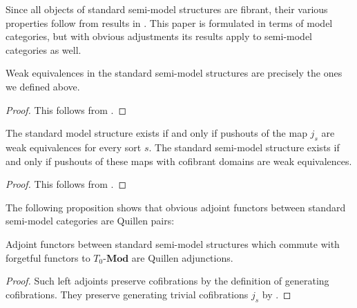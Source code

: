 \documentclass[reqno]{amsart}
\theoremstyle{definition}
\theoremstyle{remark}
\newcommand{\bcat}[1]{\mathbf{#1}}
\newcommand{\Mod}[1]{#1\text{-}\bcat{Mod}}
\numberwithin{figure}{section}
\begin{document}
Since all objects of standard semi-model structures are fibrant, their various properties follow from results in \cite{f-model-structures}.
This paper is formulated in terms of model categories, but with obvious adjustments its results apply to semi-model categories as well.

\begin{prop}
Weak equivalences in the standard semi-model structures are precisely the ones we defined above.
\end{prop}
\begin{proof}
This follows from \cite[Proposition~3.5]{f-model-structures}.
\end{proof}

\begin{prop}
The standard model structure exists if and only if pushouts of the map $j_s$ are weak equivalences for every sort $s$.
The standard semi-model structure exists if and only if pushouts of these maps with cofibrant domains are weak equivalences.
\end{prop}
\begin{proof}
This follows from \cite[Theorem~4.3]{f-model-structures}.
\end{proof}

The following proposition shows that obvious adjoint functors between standard semi-model categories are Quillen pairs:

\begin{prop}
Adjoint functors between standard semi-model structures which commute with forgetful functors to $\Mod{T_0}$ are Quillen adjunctions.
\end{prop}
\begin{proof}
Such left adjoints preserve cofibrations by the definition of generating cofibrations.
They preserve generating trivial cofibrations $j_s$ by .
\end{proof}
\end{document}
